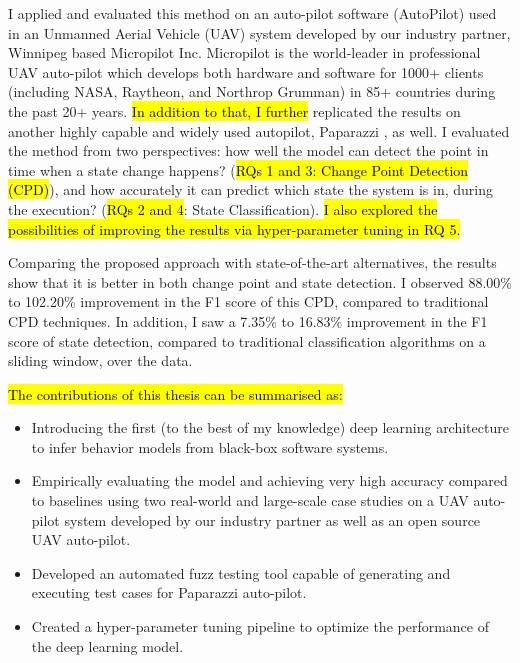 

I applied and evaluated this method on an auto-pilot software (AutoPilot) used in an Unmanned Aerial Vehicle (UAV) system developed by our industry partner, Winnipeg based Micropilot Inc. Micropilot is the world-leader in professional UAV auto-pilot which develops both hardware and software for 1000+ clients (including NASA, Raytheon, and Northrop Grumman) in 85+ countries during the past 20+ years. \hl{In addition to that, I further} replicated the results on another highly capable and widely used autopilot, Paparazzi \cite{hattenberger2014using}, as well.
I evaluated the method from two perspectives: how well the model can detect the point in time when a state change happens? (\hl{RQs 1 and 3: Change Point Detection (CPD)}), and how accurately it can predict which state the system is in, during the execution? (\hl{RQs 2 and 4}: State Classification). \hl{I also explored the possibilities of improving the results via hyper-parameter tuning in RQ 5.}



Comparing the proposed approach with state-of-the-art alternatives, the results show that it is better in both change point and state detection. I observed 88.00\% to 102.20\% improvement in the F1 score of this CPD, compared to traditional CPD techniques. In addition, I saw a 7.35\% to 16.83\% improvement in the F1 score of state detection, compared to traditional classification algorithms on a sliding window, over the data.


\hl{The contributions of this thesis can be summarised as:}
\begin{itemize}
    \item Introducing the first (to the best of my knowledge) deep learning architecture to infer behavior models from black-box software systems.
    \item Empirically evaluating the model and achieving very high accuracy compared to baselines using two real-world and large-scale case studies on a UAV auto-pilot system developed by our industry partner as well as an open source UAV auto-pilot.
    \item Developed an automated fuzz testing tool capable of generating and executing test cases for Paparazzi auto-pilot.
    \item Created a hyper-parameter tuning pipeline to optimize the performance of the deep learning model.
\end{itemize}

